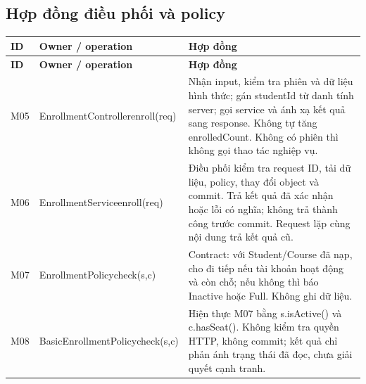 \subsection{Hợp đồng điều phối và policy}
\begin{longtable}{|L{15mm}|L{43mm}|L{82mm}|}\hline
\textbf{ID} & \textbf{Owner / operation} & \textbf{Hợp đồng}\\\hline
\endfirsthead
\hline
\textbf{ID} & \textbf{Owner / operation} & \textbf{Hợp đồng}\\\hline
\endhead
M05 & {\small EnrollmentController}\newline enroll(req) & Nhận input, kiểm tra phiên và dữ liệu hình thức; gán studentId từ danh tính server; gọi service và ánh xạ kết quả sang response. Không tự tăng enrolledCount. Không có phiên thì không gọi thao tác nghiệp vụ.\\\hline
M06 & {\small EnrollmentService}\newline enroll(req) & Điều phối kiểm tra request ID, tải dữ liệu, policy, thay đổi object và commit. Trả kết quả đã xác nhận hoặc lỗi có nghĩa; không trả thành công trước commit. Request lặp cùng nội dung trả kết quả cũ.\\\hline
M07 & {\small EnrollmentPolicy}\newline check(s,c) & Contract: với Student/Course đã nạp, cho đi tiếp nếu tài khoản hoạt động và còn chỗ; nếu không thì báo Inactive hoặc Full. Không ghi dữ liệu.\\\hline
M08 & {\small BasicEnrollmentPolicy}\newline check(s,c) & Hiện thực M07 bằng s.isActive() và c.hasSeat(). Không kiểm tra quyền HTTP, không commit; kết quả chỉ phản ánh trạng thái đã đọc, chưa giải quyết cạnh tranh.\\\hline
\end{longtable}

